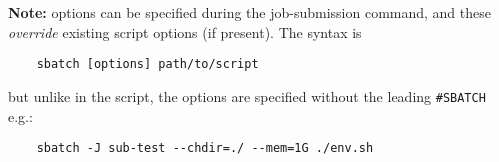 \noindent \textbf{Note:}  options can be specified during the job-submission command,
and these \emph{override} existing script options (if present). The syntax is
\begin{verbatim}
	sbatch [options] path/to/script
\end{verbatim}
but unlike in the script, the options are specified without the leading \verb+#SBATCH+
e.g.:
\begin{verbatim}
	sbatch -J sub-test --chdir=./ --mem=1G ./env.sh
\end{verbatim}